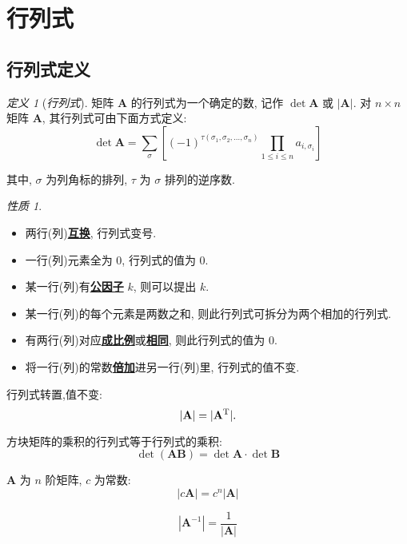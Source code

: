 \documentclass[UTF8]{ctexart}
\theoremstyle{remark}
\newtheorem{Definition}{\hspace{1em} 定义}[subsection]
\newtheorem*{Property}{\hspace{1em} 性质}
\newenvironment{definition}[1]
{\begin{Definition}[#1] \hspace{0.5em}}
{\end{Definition} \vspace{0.5em}}
\newenvironment{property}
{\begin{Property} \hspace{0.5em}}
{\end{Property} \vspace{0.5em}}
\newcommand{\mb}{\mathbf}
\begin{document}
\section{行列式}
\subsection{行列式定义}
\begin{framed}
    \begin{definition}{\textit{行列式}}
        矩阵 $ \mb A $ 的行列式为一个确定的数, 记作 $ \det \mb A $ 或 $ |\mb A| $. 对 $ n \times n $ 矩阵 $ \mb A $, 其行列式可由下面方式定义:
        \[ \det \mb A = \sum_{\sigma}\left[ (-1)^{\tau(\sigma_1, \sigma_2, \dots, \sigma_n)} \prod_{1 \leqslant i \leqslant n} a_{i, \sigma_i} \right] \]

        其中, $ \sigma $ 为列角标的排列, $ \tau $ 为 $ \sigma $ 排列的逆序数.
    \end{definition}

    \begin{property} 
        \begin{itemize}
            \item 两行(列)\underline{\textbf{互换}}, 行列式变号.
            \item 一行(列)元素全为 $ 0 $, 行列式的值为 $ 0 $.
            \item 某一行(列)有\underline{\textbf{公因子}} $ k $, 则可以提出 $ k $.
            \item 某一行(列)的每个元素是两数之和, 则此行列式可拆分为两个相加的行列式.
            \item 有两行(列)对应\underline{\textbf{成比例}}或\underline{\textbf{相同}}, 则此行列式的值为 $ 0 $.
            \item 将一行(列)的常数\underline{\textbf{倍加}}进另一行(列)里, 行列式的值不变.
        \end{itemize}

        行列式转置,值不变: 
        \[ |\mb A| = |\mb A^{\rm T}| .\] 
    
        方块矩阵的乘积的行列式等于行列式的乘积:
        \[ \det (\mb{AB}) = \det \mb A \cdot \det \mb B \]

        $ \mb A $ 为 $ n $ 阶矩阵, $ c $ 为常数:
        \[ |c \mb A| = c^n |\mb A| \]

        \[ |\mb A^{-1}| = \dfrac{1}{|\mb A|} \]


    \end{property}
\end{framed}
\end{document}
